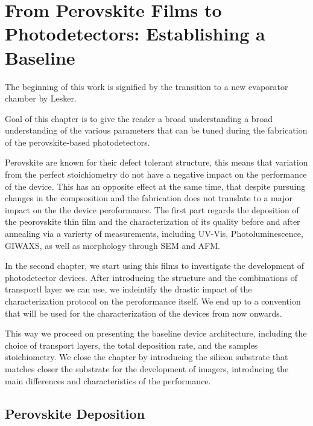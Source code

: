 \chapter{From Perovskite Films to Photodetectors: Establishing a Baseline}\label{ch:material_properties}


The beginning of this work is signified by the transition to a new evaporator chamber by Lesker. 

Goal of this chapter is to give the reader a broad understanding a broad understanding of the various parameters that can be tuned during the fabrication of the perovskite-based photodetectors. 

Perovskite are known for their defect tolerant structure, this means that variation from the perfect stoichiometry do not have a negative impact on the performance of the device. This has an opposite effect at the same time, that despite pursuing changes in the compsosition and the fabrication does not translate to a major impact on the the device peroformance. The first part regards the deposition of the peorovskite thin film and the characterization of its quality before and after annealing via a varierty of measurements, including UV-Vis, Photoluminescence, GIWAXS, as well as morphology through SEM and AFM. 

In the second chapter, we start using this films to investigate the development of photodetector devices. After introducing the structure and the combinations of transportl layer we can use, we indeintify the drastic impact of the characterization protocol on the peroformance itself. We end up to a convention that will be used for the characterization of the devices from now onwards. 

This way we proceed on presenting the baseline device architecture, including the choice of transport layers, the total deposition rate, and the samples stoichiometry. We close the chapter by introducing the silicon substrate that matches closer the substrate for the development of imagers, introducing the main differences and characteristics of the performance. 



\section{Perovskite Deposition}



